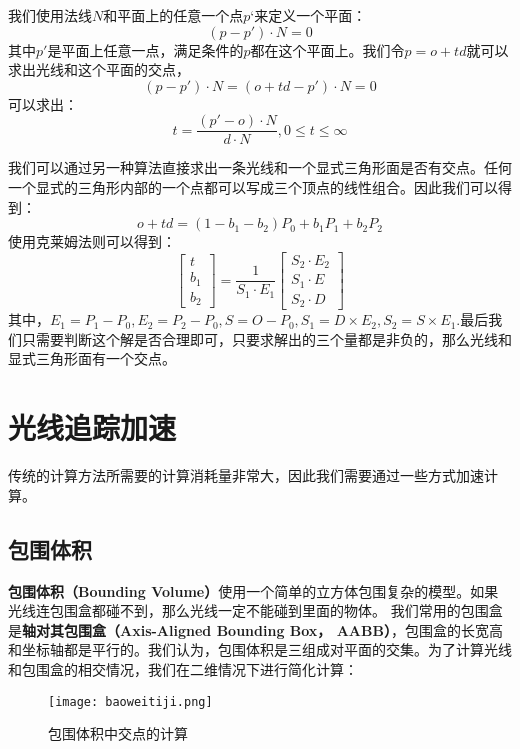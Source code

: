 \documentclass[openany]{progbookcn}
\begin{document}
我们使用法线$N$和平面上的任意一个点$p‘$来定义一个平面：
\begin{equation}
	(p-p')\cdot N = 0
\end{equation}
其中$p'$是平面上任意一点，满足条件的$p$都在这个平面上。我们令$p=o+td$就可以求出光线和这个平面的交点，
\begin{equation}
	(p-p')\cdot N = (o+td-p')\cdot N = 0
\end{equation}
可以求出：
\begin{equation}
	t = \frac{(p'-o)\cdot N}{d\cdot N}, 0\le t \le \infty
\end{equation}

我们可以通过另一种算法直接求出一条光线和一个显式三角形面是否有交点。任何一个显式的三角形内部的一个点都可以写成三个顶点的线性组合。因此我们可以得到：
\begin{equation}
	o+td=(1-b_1-b_2)P_0+b_1P_1+b_2P_2
\end{equation}使用克莱姆法则可以得到：
\begin{equation}
	\begin{bmatrix}
		t\\ 
		b_1\\ 
		b_2
	\end{bmatrix}=\frac{1}{S_1\cdot E_1}\begin{bmatrix}
		S_2\cdot E_2\\ 
		S_1\cdot E\\ 
		S_2\cdot D
	\end{bmatrix}
\end{equation}其中，$E_1=P_1-P_0,E_2=P_2-P_0,S=O-P_0,S_1=D\times E_2, S_2=S\times E_1$.最后我们只需要判断这个解是否合理即可，只要求解出的三个量都是非负的，那么光线和显式三角形面有一个交点。

\section{光线追踪加速}
传统的计算方法所需要的计算消耗量非常大，因此我们需要通过一些方式加速计算。
\subsection{包围体积}
\textbf{包围体积（Bounding Volume）}使用一个简单的立方体包围复杂的模型。如果光线连包围盒都碰不到，那么光线一定不能碰到里面的物体。
我们常用的包围盒是\textbf{轴对其包围盒（Axis-Aligned Bounding Box， AABB）}，包围盒的长宽高和坐标轴都是平行的。我们认为，包围体积是三组成对平面的交集。为了计算光线和包围盒的相交情况，我们在二维情况下进行简化计算：
\begin{figure}[H]
	\centering
	\texttt{[image: baoweitiji.png]}
	\caption{包围体积中交点的计算}
	\label{fig:bwtj}
\end{figure}
\end{document}
